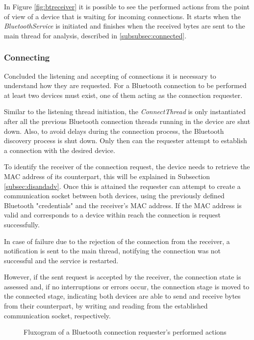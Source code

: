 In Figure \ref{fig:btreceiver} it is possible to see the performed actions from the point of view of a device that is waiting for incoming connections. It starts when the \textit{BluetoothService} is initiated and finishes when the received bytes are sent to the main thread for analysis, described in \ref{subsubsec:connected}.

\subsubsection{Connecting}
\label{subsubsec:connecting}

Concluded the listening and accepting of connections it is necessary to understand how they are requested. For a Bluetooth connection to be performed at least two devices must exist, one of them acting as the connection requester.

Similar to the listening thread initiation, the \textit{ConnectThread} is only instantiated after all the previous Bluetooth connection threads running in the device are shut down. Also, to avoid delays during the connection process, the Bluetooth discovery process is shut down. Only then can the requester attempt to establish a connection with the desired device.

To identify the receiver of the connection request, the device needs to retrieve the \gls{MAC} address of its counterpart, this will be explained in Subsection \ref{subsec:disandadv}. Once this is attained the requester can attempt to create a communication socket between both devices, using the previously defined Bluetooth "credentials" and the receiver's \gls{MAC} address. If the \gls{MAC} address is valid and corresponds to a device within reach the connection is request successfully.

In case of failure due to the rejection of the connection from the receiver, a notification is sent to the main thread, notifying the connection was not successful and the service is restarted.

However, if the sent request is accepted by the receiver, the connection state is assessed and, if no interruptions or errors occur, the connection stage is moved to the connected stage, indicating both devices are able to send and receive bytes from their counterpart, by writing and reading from the established communication socket, respectively.

\begin{figure}[ht]
	\noindent{}
	\caption{\label{fig:btrequester} Fluxogram of a Bluetooth connection requester's performed actions}
\end{figure}

